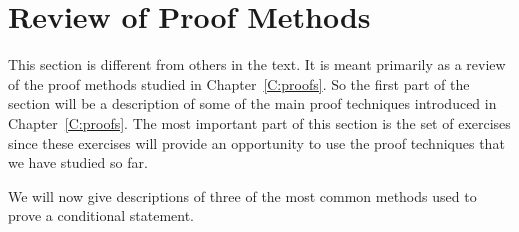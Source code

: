 \section{Review of Proof Methods} \label{S:reviewproofs}
\setcounter{previewactivity}{0}
This section is different from others in the text.  It is meant primarily as a review of the proof methods studied in Chapter~\ref{C:proofs}.  So the first part of the section will be a description of some of the main proof techniques introduced in Chapter~\ref{C:proofs}.  The most important part of this section is the set of exercises since these exercises will provide an opportunity to use the proof techniques that we have studied so far.

%

We will now give descriptions of three of the most common methods used to prove a conditional statement.






\endinput
